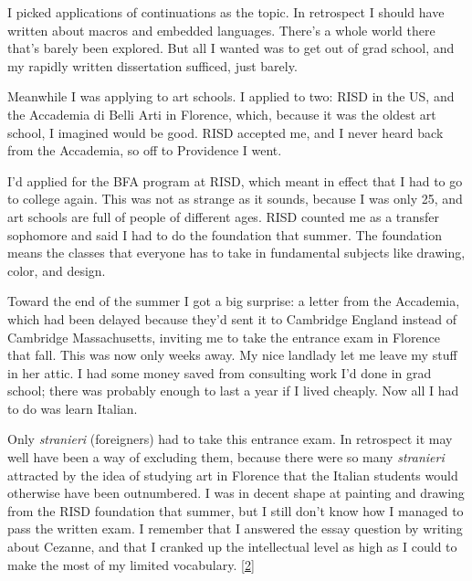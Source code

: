 I picked applications of
                  continuations as the topic. In retrospect I should have
                  written about macros and embedded languages. There's a whole
                  world there that's barely been explored. But all I wanted was
                  to get out of grad school, and my rapidly written dissertation
                  sufficed, just barely.

Meanwhile I was applying to
                  art schools. I applied to two: RISD in the US, and the
                  Accademia di Belli Arti in Florence, which, because it was the
                  oldest art school, I imagined would be good. RISD accepted me,
                  and I never heard back from the Accademia, so off to
                  Providence I went.

I'd applied for the BFA program
                  at RISD, which meant in effect that I had to go to college
                  again. This was not as strange as it sounds, because I was
                  only 25, and art schools are full of people of different ages.
                  RISD counted me as a transfer sophomore and said I had to do
                  the foundation that summer. The foundation means the classes
                  that everyone has to take in fundamental subjects like
                  drawing, color, and design.

Toward the end of the
                  summer I got a big surprise: a letter from the Accademia,
                  which had been delayed because they'd sent it to Cambridge
                  England instead of Cambridge Massachusetts, inviting me to
                  take the entrance exam in Florence that fall. This was now
                  only weeks away. My nice landlady let me leave my stuff in her
                  attic. I had some money saved from consulting work I'd done in
                  grad school; there was probably enough to last a year if I
                  lived cheaply. Now all I had to do was learn Italian.

Only
                  \emph{stranieri} (foreigners) had to take this entrance exam.
                  In retrospect it may well have been a way of excluding them,
                  because there were so many \emph{stranieri} attracted by the
                  idea of studying art in Florence that the Italian students
                  would otherwise have been outnumbered. I was in decent shape
                  at painting and drawing from the RISD foundation that summer,
                  but I still don't know how I managed to pass the written exam.
                  I remember that I answered the essay question by writing about
                  Cezanne, and that I cranked up the intellectual level as high
                  as I could to make the most of my limited vocabulary.
                  [\href{\#f2n}{2}]

